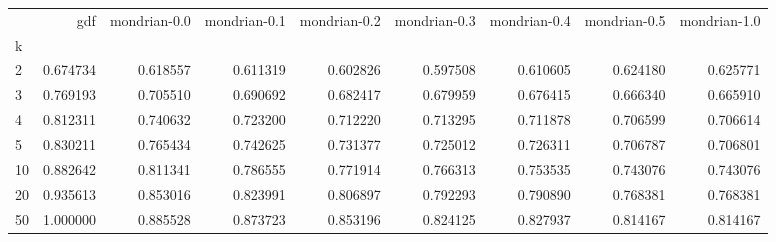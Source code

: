 \begin{tabular}{lrrrrrrrr}
\toprule
{} &       gdf &  mondrian-0.0 &  mondrian-0.1 &  mondrian-0.2 &  mondrian-0.3 &  mondrian-0.4 &  mondrian-0.5 &  mondrian-1.0 \\
k  &           &               &               &               &               &               &               &               \\
\midrule
2  &  0.674734 &      0.618557 &      0.611319 &      0.602826 &      0.597508 &      0.610605 &      0.624180 &      0.625771 \\
3  &  0.769193 &      0.705510 &      0.690692 &      0.682417 &      0.679959 &      0.676415 &      0.666340 &      0.665910 \\
4  &  0.812311 &      0.740632 &      0.723200 &      0.712220 &      0.713295 &      0.711878 &      0.706599 &      0.706614 \\
5  &  0.830211 &      0.765434 &      0.742625 &      0.731377 &      0.725012 &      0.726311 &      0.706787 &      0.706801 \\
10 &  0.882642 &      0.811341 &      0.786555 &      0.771914 &      0.766313 &      0.753535 &      0.743076 &      0.743076 \\
20 &  0.935613 &      0.853016 &      0.823991 &      0.806897 &      0.792293 &      0.790890 &      0.768381 &      0.768381 \\
50 &  1.000000 &      0.885528 &      0.873723 &      0.853196 &      0.824125 &      0.827937 &      0.814167 &      0.814167 \\
\bottomrule
\end{tabular}
